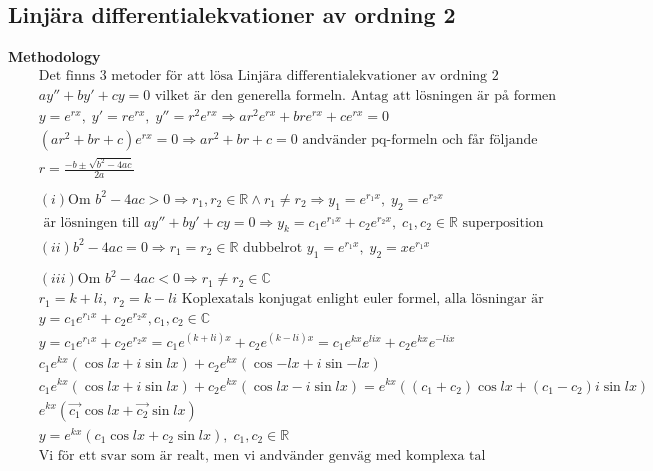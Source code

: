 \subsection{Linjära differentialekvationer av ordning 2}
\textbf{Methodology}  
\begin{align*}
  &\quad  \text{Det finns 3 metoder för att lösa Linjära differentialekvationer av ordning 2} \\
  &\quad  ay'' + by' +cy = 0 \text{ vilket är den generella formeln. Antag att lösningen är på formen} \\
  &\quad  y=e^{rx}, \; y'=re^{rx}, \; y''=r^2e^{rx} \Rightarrow ar^2e^{rx} + bre^{rx} + ce^{rx} = 0 \\
  &\quad  (ar^2+br+c)e^{rx}=0 \Rightarrow ar^2+br+c=0 \text{ andvänder pq-formeln och får följande } \\
  &\quad  r= \frac{-b\pm\sqrt{b^2-4ac}}{2a} \\
  &\quad  \\
  &\quad  (i) \text{Om } b^2-4ac > 0 \Rightarrow r_1,r_2\in\mathbb{R} \land r_1\neq r_2  \Rightarrow
  y_1=e^{r_1x}, \; y_2=e^{r_2x} \\
  &\quad  \text{ är lösningen till }  ay'' + by' +cy = 0 \Rightarrow y_k=c_1e^{r_1x} + c_2e^{r_2x},\;
  c_1,c_2\in\mathbb{R} \text{ superposition}
  &\quad  \\
  &\quad  (ii) b^2-4ac=0 \Rightarrow r_1=r_2\in\mathbb{R} \text{ dubbelrot } y_1=e^{r_1x}, \; y_2=xe^{r_1x} \\
  &\quad  \\
  &\quad  (iii) \text{Om } b^2-4ac<0 \Rightarrow r_1\neq r_2 \in\mathbb{C}  \\
  &\quad  r_1=k+li, \; r_2=k-li  \text{ Koplexatals konjugat enlight euler formel, alla lösningar är } \\
  &\quad  y=c_1e^{r_1x} + c_2e^{r_2x}, c_1,c_2 \in\mathbb{C}  \\
  &\quad  y=c_1e^{r_1x} + c_2e^{r_2x}=c_1e^{(k+li)x} + c_2e^{(k-li)x} =
  c_1e^{kx}e^{lix} + c_2e^{kx}e^{-lix} \\
  &\quad  c_1e^{kx}(\cos{lx} + i\sin{lx}) + c_2e^{kx}(\cos{-lx} + i\sin{-lx}) \\
  &\quad  c_1e^{kx}(\cos{lx} + i\sin{lx}) + c_2e^{kx}(\cos{lx} - i\sin{lx}) =
  e^{kx}((c_1+c_2)\cos{lx} + (c_1-c_2)i\sin{lx}) \\
  &\quad  e^{kx}(\vec{c_1}\cos{lx} + \vec{c_2}\sin{lx}) \\
  &\quad  y = e^{kx}(c_1\cos{lx} + c_2\sin{lx}), \; c_1,c_2\in\mathbb{R} \\
  &\quad  \text{Vi för ett svar som är realt, men vi andvänder genväg med komplexa tal}
\end{align*}



